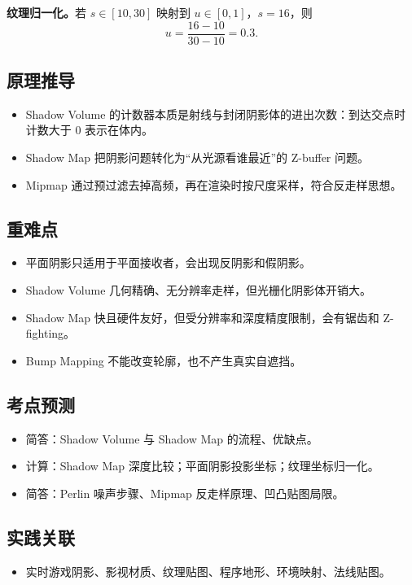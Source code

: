 \documentclass[UTF8,zihao=-4,scheme=chinese,fontset=fandol]{ctexart}
\begin{document}
\textbf{纹理归一化。}若 $s\in[10,30]$ 映射到 $u\in[0,1]$，$s=16$，则
\[
u=\frac{16-10}{30-10}=0.3.
\]

\subsection{原理推导}
\begin{itemize}
  \item Shadow Volume 的计数器本质是射线与封闭阴影体的进出次数：到达交点时计数大于 0 表示在体内。
  \item Shadow Map 把阴影问题转化为“从光源看谁最近”的 Z-buffer 问题。
  \item Mipmap 通过预过滤去掉高频，再在渲染时按尺度采样，符合反走样思想。
\end{itemize}

\subsection{重难点}
\begin{itemize}
  \item 平面阴影只适用于平面接收者，会出现反阴影和假阴影。
  \item Shadow Volume 几何精确、无分辨率走样，但光栅化阴影体开销大。
  \item Shadow Map 快且硬件友好，但受分辨率和深度精度限制，会有锯齿和 Z-fighting。
  \item Bump Mapping 不能改变轮廓，也不产生真实自遮挡。
\end{itemize}

\subsection{考点预测}
\begin{itemize}
  \item 简答：Shadow Volume 与 Shadow Map 的流程、优缺点。
  \item 计算：Shadow Map 深度比较；平面阴影投影坐标；纹理坐标归一化。
  \item 简答：Perlin 噪声步骤、Mipmap 反走样原理、凹凸贴图局限。
\end{itemize}

\subsection{实践关联}
\begin{itemize}
  \item 实时游戏阴影、影视材质、纹理贴图、程序地形、环境映射、法线贴图。
\end{itemize}
\end{document}
